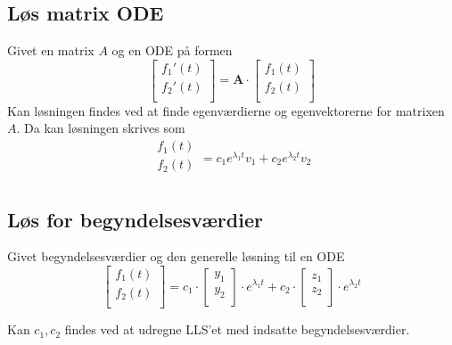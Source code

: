\subsection{Løs matrix ODE}
Givet en matrix $A$ og en ODE på formen
\[
\begin{bmatrix}
    f_1'(t) \\
    f_2'(t) \\
\end{bmatrix}
=
\textbf{A} \cdot
\begin{bmatrix}
    f_1(t) \\
    f_2(t) \\
\end{bmatrix}
\]
Kan løsningen findes ved at finde egenværdierne og egenvektorerne for matrixen $A$.
Da kan løsningen skrives som
\[
\begin{split}
    f_1(t) \\
    f_2(t) \\
\end{split}
= c_1 e^{\lambda_1 t} v_1 + c_2 e^{\lambda_2 t} v_2
\]

\subsection{Løs for begyndelsesværdier}
Givet begyndelsesværdier og den generelle løsning til en ODE
\[
\begin{bmatrix}
    f_1(t) \\
    f_2(t) \\
\end{bmatrix}
=
c_1 \cdot
\begin{bmatrix}
    y_1 \\
    y_2 \\
\end{bmatrix}
\cdot e^{\lambda_1 t}
+ c_2 \cdot
\begin{bmatrix}
    z_1 \\
    z_2 \\
\end{bmatrix}
\cdot e^{\lambda_2 t}
\]

Kan $c_1, c_2$ findes ved at udregne LLS'et med indsatte begyndelsesværdier.

